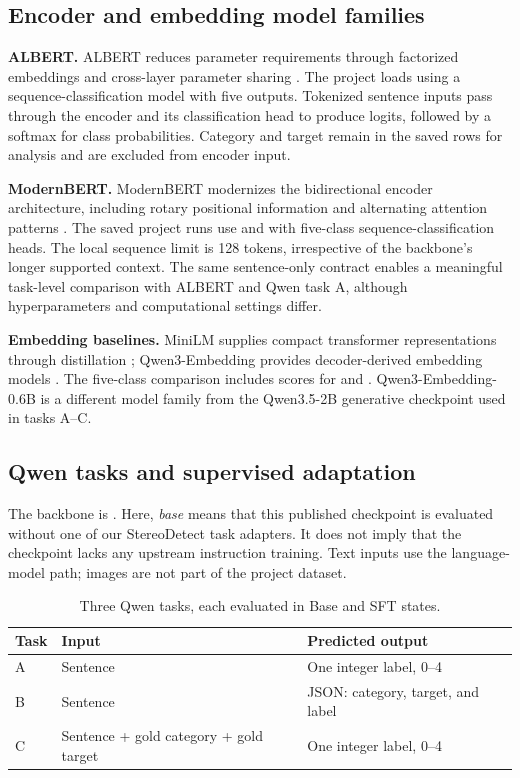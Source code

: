\subsection{Encoder and embedding model families}
\textbf{ALBERT.} ALBERT reduces parameter requirements through factorized embeddings and cross-layer parameter sharing \citep{lan2020}. The project loads  using a sequence-classification model with five outputs. Tokenized sentence inputs pass through the encoder and its classification head to produce logits, followed by a softmax for class probabilities. Category and target remain in the saved rows for analysis and are excluded from encoder input.

\textbf{ModernBERT.} ModernBERT modernizes the bidirectional encoder architecture, including rotary positional information and alternating attention patterns \citep{warner2024}. The saved project runs use  and  with five-class sequence-classification heads. The local sequence limit is 128 tokens, irrespective of the backbone's longer supported context. The same sentence-only contract enables a meaningful task-level comparison with ALBERT and Qwen task A, although hyperparameters and computational settings differ.

\textbf{Embedding baselines.} MiniLM supplies compact transformer representations through distillation \citep{wang2020}; Qwen3-Embedding provides decoder-derived embedding models \citep{zhang2025}. The five-class comparison includes scores for  and . Qwen3-Embedding-0.6B is a different model family from the Qwen3.5-2B generative checkpoint used in tasks A--C.

\subsection{Qwen tasks and supervised adaptation}
The backbone is  \citep{qwen2026}. Here, \emph{base} means that this published checkpoint is evaluated without one of our StereoDetect task adapters. It does not imply that the checkpoint lacks any upstream instruction training. Text inputs use the language-model path; images are not part of the project dataset.

\begin{table}[H]
\centering\small
\caption{Three Qwen tasks, each evaluated in Base and SFT states.}
\label{tab:contracts}
\begin{tabularx}{\linewidth}{lXX}
\toprule Task & Input & Predicted output\\\midrule
A & Sentence & One integer label, 0--4\\
B & Sentence & JSON: category, target, and label\\
C & Sentence + gold category + gold target & One integer label, 0--4\\\bottomrule
\end{tabularx}
\end{table}

